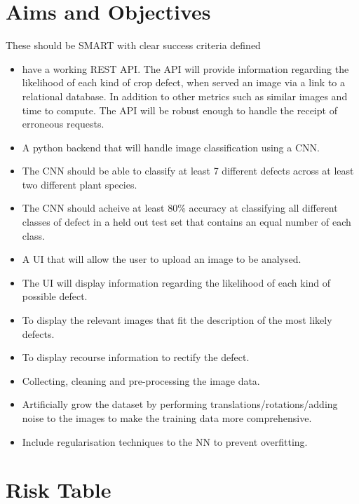 \section{Aims and Objectives}
  These should be SMART with clear success criteria defined
  \begin{itemize}
  	\item have a working REST API. The API will provide information regarding the likelihood of each kind of crop defect, when served an image via a link to a relational database. In addition to other metrics such as similar images and time to compute. The API will be robust enough to handle the receipt of erroneous requests.
  	\item A python backend that will handle image classification using a CNN.
    \item The CNN should be able to classify at least 7 different defects across at least two different plant species.
    \item The CNN should acheive at least 80\% accuracy at classifying all different classes of defect in a held out test set that contains an equal number of each class.
  	\item A UI that will allow the user to upload an image to be analysed.
  	\item The UI will display information regarding the likelihood of each kind of possible defect.
  	\item To display the relevant images that fit the description of the most likely defects.
  	\item To display recourse information to rectify the defect.
  	\item Collecting, cleaning and pre-processing the image data.
    \item Artificially grow the dataset by performing translations/rotations/adding noise to the images to make the training data more comprehensive.
  	\item Include regularisation techniques to the NN to prevent overfitting.
  \end{itemize}
\section{Risk Table}


